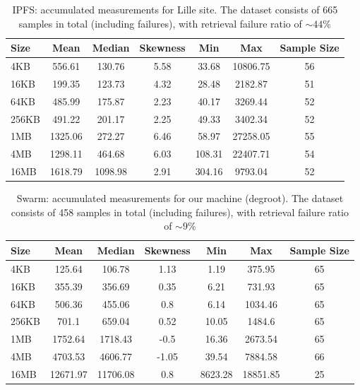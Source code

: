 \begin{table}[H]
\centering
\begin{small}
\caption{IPFS: accumulated measurements for Lille site. The dataset consists of 665 samples in total (including failures), with retrieval failure ratio of $\sim 44\%$ }
\begin{tabular}{@{}lcccccc@{}}
\toprule
Size & Mean & Median & Skewness & Min & Max & Sample Size \\ \midrule
4KB & 556.61 & 130.76 & 5.58 & 33.68 & 10806.75 & 56\\
16KB & 199.35 & 123.73 & 4.32 & 28.48 & 2182.87 & 51\\
64KB & 485.99 & 175.87 & 2.23 & 40.17 & 3269.44 & 52\\
256KB & 491.22 & 201.17 & 2.25 & 49.33 & 3402.34 & 52\\
1MB & 1325.06 & 272.27 & 6.46 & 58.97 & 27258.05 & 55\\
4MB & 1298.11 & 464.68 & 6.03 & 108.31 & 22407.71 & 54\\
16MB & 1618.79 & 1098.98 & 2.91 & 304.16 & 9793.04 & 52\\
\bottomrule
\end{tabular}
\end{small}
\end{table}





\begin{table}[H]
\centering
\begin{small}
\caption{Swarm: accumulated measurements for our machine (degroot). The dataset consists of 458 samples in total (including failures), with retrieval failure ratio of $\sim 9\%$ }
\begin{tabular}{@{}lcccccc@{}}
\toprule
Size & Mean & Median & Skewness & Min & Max & Sample Size \\ \midrule
4KB & 125.64 & 106.78 & 1.13 & 1.19 & 375.95 & 65\\
16KB & 355.39 & 356.69 & 0.35 & 6.21 & 731.93 & 65\\
64KB & 506.36 & 455.06 & 0.8 & 6.14 & 1034.46 & 65\\
256KB & 701.1 & 659.04 & 0.52 & 10.05 & 1484.6 & 65\\
1MB & 1752.64 & 1718.43 & -0.5 & 16.36 & 2673.54 & 65\\
4MB & 4703.53 & 4606.77 & -1.05 & 39.54 & 7884.58 & 66\\
16MB & 12671.97 & 11706.08 & 0.8 & 8623.28 & 18851.85 & 25\\
\bottomrule
\end{tabular}
\end{small}
\end{table}

